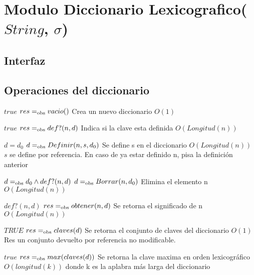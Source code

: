 \section{Modulo Diccionario Lexicografico($String$, $\sigma$)}

\subsection{Interfaz}


  \subsection*{Operaciones del diccionario}

 {$true$}
 {$res =_{\mathrm{obs}} vacio()$}
 {Crea un nuevo diccionario}
 {$O(1)$}
 {}

 
  {$true$}
  {$res =_{\mathrm{obs}} def?(n,d)$}
  {Indica si la clave esta definida}
  {$O(Longitud(n))$}
  {}

  {$d=d_0$}
  {$d =_{\mathrm{obs}} Definir(n, s, d_0)$}
  {Se define s en el diccionario}
  {$O(Longitud(n))$}
  {$s$ se define por referencia. En caso de ya estar definido n, pisa la definición anterior}

 {$d =_{\mathrm{obs}} d_0 \land def?(n,d)$}
 {$d =_{\mathrm{obs}} Borrar(n,d_0)$}
 {Elimina el elemento n}
 {$O(Longitud(n))$}
 {}

 {$def?(n,d)$}
 {$res =_{\mathrm{obs}} obtener(n,d)$}
 {Se retorna el significado de n}
 {$O(Longitud(n))$}
 {}
 
 {$TRUE$}
 {$res =_{\mathrm{obs}} claves(d)$}
 {Se retorna el conjunto de claves del diccionario}
 {$O(1)$}
 {Res un conjunto devuelto por referencia no modificable. }
 
 {$true$}
 {$res =_{\mathrm{obs}} max(claves(d))$}
 {Se retorna la clave maxima en orden lexicográfico}
 {$O(longitud(k))$ donde k es la aplabra más larga del diccionario}
 {}
 
